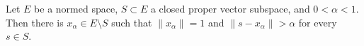 \documentclass[12pt]{article}
\begin{document}
Let $E$ be a normed space, $S \subset E$ a closed proper vector subspace, and $0 < \alpha < 1$. Then there is $x_{\alpha} \in E \setminus S$ such that $\|x_{\alpha}\| = 1$ and $\|s - x_{\alpha}\| > \alpha $ for every $ s \in S$.
\end{document}
